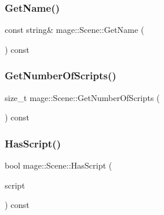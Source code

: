 \hypertarget{classmage_1_1_scene_a6afd25c30d08eb579eb430af49cf8fc0}{}\label{classmage_1_1_scene_a6afd25c30d08eb579eb430af49cf8fc0} 
\subsubsection{\texorpdfstring{Get\+Name()}{GetName()}}
{\footnotesize\ttfamily const string\& mage\+::\+Scene\+::\+Get\+Name (\begin{DoxyParamCaption}{ }\end{DoxyParamCaption}) const\hspace{0.3cm}{\ttfamily [noexcept]}}

\hypertarget{classmage_1_1_scene_a33cecd2fd2b393ccac84b94ec8cc53c0}{}\label{classmage_1_1_scene_a33cecd2fd2b393ccac84b94ec8cc53c0} 
\subsubsection{\texorpdfstring{Get\+Number\+Of\+Scripts()}{GetNumberOfScripts()}}
{\footnotesize\ttfamily size\+\_\+t mage\+::\+Scene\+::\+Get\+Number\+Of\+Scripts (\begin{DoxyParamCaption}{ }\end{DoxyParamCaption}) const\hspace{0.3cm}{\ttfamily [noexcept]}}

\hypertarget{classmage_1_1_scene_a9dd6c49e9db7590de1de4fbd128c78a9}{}\label{classmage_1_1_scene_a9dd6c49e9db7590de1de4fbd128c78a9} 
\subsubsection{\texorpdfstring{Has\+Script()}{HasScript()}}
{\footnotesize\ttfamily bool mage\+::\+Scene\+::\+Has\+Script (\begin{DoxyParamCaption}\item[{\hyperlink{namespacemage_a1e01ae66713838a7a67d30e44c67703e}{Shared\+Ptr}$<$ const \hyperlink{classmage_1_1_behavior_script}{Behavior\+Script} $>$}]{script }\end{DoxyParamCaption}) const}

